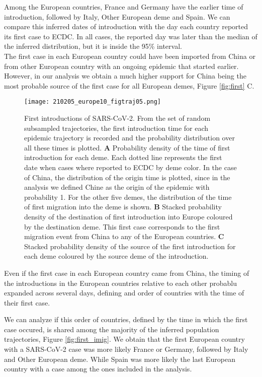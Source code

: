 Among the European countries, France and Germany have the earlier time of introduction, followed by Italy, Other European deme and Spain. We can compare this inferred dates of introduction with the day each country reported its first case to ECDC. In all cases, the reported day was later than the median of the inferred distribution, but it is inside the 95\% interval.\\

The first case in each European country could have been imported from China or from other European country with an ongoing epidemic that started earlier. However, in our analysis we obtain a much higher support for China being the most probable source of the first case for all European demes, Figure \ref{fig:first} C.\\

\begin{figure}[h]
    \centering
    \texttt{[image: 210205\_europe10\_figtraj05.png]}
    \caption{First introductions of SARS-CoV-2. From the set of random subsampled trajectories, the first introduction time for each epidemic trajectory is recorded and the probability distribution over all these times is plotted. \textbf{A} Probability density of the time of first introduction for each deme. Each dotted line represents the first date when cases where reported to ECDC by deme color. In the case of China, the distribution of the origin time is plotted, since in the analysis we defined Chine as the origin of the epidemic with probability 1. For the other five demes, the distribution of the time of first migration into the deme is shown. \textbf{B} Stacked probability density of the destination of first introduction into Europe coloured by the destination deme. This first case corresponds to the first migration event from China to any of the European countries. \textbf{C} Stacked probability density of the source of the first introduction for each deme coloured by the source deme of the introduction.}
    \label{fig:firstEUcountry}
\end{figure}

Even if the first case in each European country came from China, the timing of the introductions in the European countries relative to each other probablu expanded across several days, defining and order of countries with the time of their first case. 

We can analyze if this order of countries, defined by the time in which the first case occured, is shared among the majority of the inferred population trajectories, Figure \ref{fig:first_imig}. We obtain that the first European country with a SARS-CoV-2 case was more likely France or Germany, followed by Italy and Other European deme. While Spain was more likely the last European country with a case among the ones included in the analysis.\\

